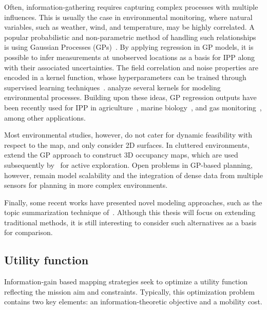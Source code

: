 Often, information-gathering requires capturing complex processes with multiple influences. This 
is usually the case in environmental monitoring, where natural variables, such as weather, 
wind, and temperature, may be highly correlated. A popular probabilistic and non-parametric method of 
handling such relationships is using Gaussian Processes (GPs)~\cite{Rasmussen2006, Hitz2015, Binney2013, 
Krause2011, Singh2009, Singh2010, Vivaldini2016}. By applying regression in GP models, it is possible to 
infer measurements at unobserved locations as a basis for IPP along with their associated uncertainties. The 
field correlation and noise properties are encoded in a kernel function, whose hyperparameters can be trained 
through supervised learning techniques~\cite{Rasmussen2006}. \citet{Singh2010} analyze several kernels 
for modeling environmental processes. Building upon these ideas, GP regression outputs have been recently 
used for IPP in agriculture~\cite{Vivaldini2016}, marine biology~\cite{Hitz2015, 
Hitz2014}, and gas monitoring~\cite{Marchant2014}, among other applications.

Most environmental studies, however, do not cater for dynamic feasibility with respect to the map, and only 
consider 2D surfaces. In cluttered environments,~\citet{OCallaghan2012} extend the GP approach to construct 
3D occupancy maps, which are used subsequently by~\citet{Yang2014} for active exploration. Open problems in 
GP-based planning, however, remain model scalability and the integration of dense data from multiple sensors 
for planning in more complex environments.

Finally, some recent works have presented novel modeling approaches, such as the topic 
summarization technique of~\citet{Girdhar2015}. Although this thesis will focus on extending traditional 
methods, it is still interesting to consider such alternatives as a basis for comparison.

\subsection{Utility function}
Information-gain based mapping strategies seek to optimize a utility function reflecting the mission 
aim and constraints. Typically, this optimization problem contains two key elements: an 
information-theoretic objective and a mobility cost.

